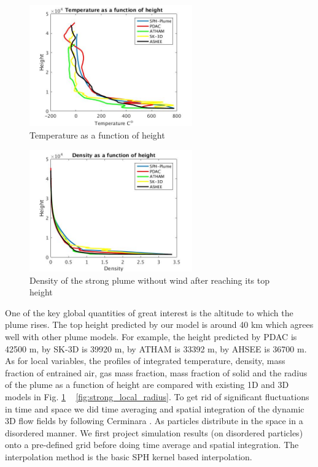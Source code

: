 \documentclass[journal abbreviation, manuscript]{copernicus}
\begin{document}
\begin{figure}
\center
\includegraphics[width=7cm]{Temp}
\caption{Temperature as a function of height}
\label{fig:strong_local_temp}
\end{figure}
\begin{figure}
\center
\includegraphics[width=7cm]{density_strong}
\caption{Density of the strong plume without wind after reaching its top height}
\label{fig:strong_local_density}
\end{figure}

One of the key global quantities of great interest is the altitude to which the plume rises. The top height predicted by our model is around 40 km which agrees well with other plume models. For example, the height predicted by PDAC is 42500 m, by SK-3D is 39920 m, by ATHAM is 33392 m, by AHSEE is 36700 m. As for local variables, the profiles of integrated temperature, density, mass fraction of entrained air, gas mass fraction, mass fraction of solid and the radius of the plume as a function of height are compared with existing 1D and 3D models in Fig. \ref{fig:strong_local_temp} ~ \ref{fig:strong_local_radius}. To get rid of significant fluctuations in time and space we did time averaging and spatial integration of the dynamic 3D flow fields by following Cerminara \citep {cerminara2016large}.
As particles distribute in the space in a disordered manner. We first project simulation results (on disordered particles) onto a pre-defined grid before doing time average and spatial integration. The interpolation method is the basic SPH kernel based interpolation.
\end{document}
